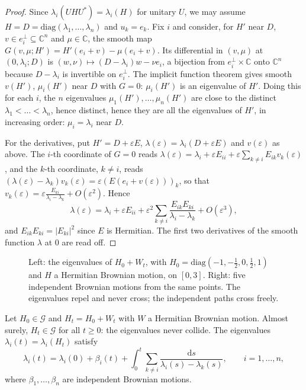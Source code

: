 \begin{proof}
Since $\lambda_i(UHU^*)=\lambda_i(H)$ for unitary $U$, we may assume $H=D=\mathrm{diag}(\lambda_1,\dots,\lambda_n)$ and $u_k=e_k$. Fix $i$ and consider, for $H'$ near $D$, $v\in e_i^\perp\subseteq\mathbb C^n$ and
$\mu\in\mathbb C$, the smooth map $G(v,\mu;H')=H'(e_i+v)-\mu(e_i+v)$. Its differential in $(v,\mu)$ at $(0,\lambda_i;D)$ is $(w,\nu)\mapsto(D-\lambda_i)w-\nu e_i$, a bijection from $e_i^\perp\times\mathbb C$ onto
$\mathbb C^n$ because $D-\lambda_i$ is invertible on $e_i^\perp$. The implicit function theorem gives smooth $v(H')$, $\mu_i(H')$ near $D$ with $G=0$: $\mu_i(H')$ is an eigenvalue of $H'$. Doing this for each $i$,
the $n$ eigenvalues $\mu_1(H'),\dots,\mu_n(H')$ are close to the distinct $\lambda_1<\dots<\lambda_n$, hence distinct, hence they are all the eigenvalues of $H'$, in increasing order: $\mu_i=\lambda_i$ near $D$.

For the derivatives, put $H'=D+\varepsilon E$, $\lambda(\varepsilon)=\lambda_i(D+\varepsilon E)$ and $v(\varepsilon)$ as above. The $i$-th coordinate of $G=0$ reads
$\lambda(\varepsilon)=\lambda_i+\varepsilon E_{ii}+\varepsilon\sum_{k\ne i}E_{ik}v_k(\varepsilon)$, and the $k$-th coordinate, $k\ne i$, reads $(\lambda(\varepsilon)-\lambda_k)v_k(\varepsilon)=\varepsilon(E(e_i+v(\varepsilon)))_k$, so that
$v_k(\varepsilon)=\varepsilon\frac{E_{ki}}{\lambda_i-\lambda_k}+O(\varepsilon^2)$. Hence
\[
\lambda(\varepsilon)=\lambda_i+\varepsilon E_{ii}+\varepsilon^2\sum_{k\ne i}\frac{E_{ik}E_{ki}}{\lambda_i-\lambda_k}+O(\varepsilon^3),
\]
and $E_{ik}E_{ki}=|E_{ki}|^2$ since $E$ is Hermitian. The first two derivatives of the smooth function $\lambda$ at $0$ are read off.
\end{proof}

\begin{figure}[ht]
\centering
{}
\caption{Left: the eigenvalues of $H_0+W_t$, with $H_0=\mathrm{diag}(-1,-\frac12,0,\frac12,1)$ and $H$ a Hermitian Brownian motion, on $[0,3]$. Right: five independent Brownian motions from the same points.
The eigenvalues repel and never cross; the independent paths cross freely.}
\label{fig:dyson}
\end{figure}

\begin{theorem}\label{thm:dyson}
Let $H_0\in\mathcal G$ and $H_t=H_0+W_t$ with $W$ a Hermitian Brownian motion. Almost surely, $H_t\in\mathcal G$ for all $t\ge0$: the eigenvalues never collide. The eigenvalues $\lambda_i(t)=\lambda_i(H_t)$ satisfy
\[
\lambda_i(t)=\lambda_i(0)+\beta_i(t)+\int_0^t\sum_{k\ne i}\frac{\mathrm ds}{\lambda_i(s)-\lambda_k(s)},\qquad i=1,\dots,n,
\]
where $\beta_1,\dots,\beta_n$ are independent Brownian motions.
\end{theorem}

